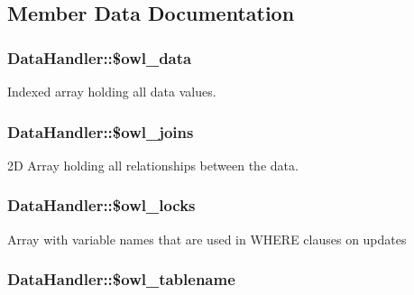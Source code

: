 \subsection{Member Data Documentation}
\hypertarget{classDataHandler_329b5524c379e0db6c4d5ce59f3c414f}{
\subsubsection{\setlength{\rightskip}{0pt plus 5cm}DataHandler::\$owl\_\-data}}
\label{classDataHandler_329b5524c379e0db6c4d5ce59f3c414f}


Indexed array holding all data values. \hypertarget{classDataHandler_da9b697f81ea82d269077f9c7445791d}{
\subsubsection{\setlength{\rightskip}{0pt plus 5cm}DataHandler::\$owl\_\-joins}}
\label{classDataHandler_da9b697f81ea82d269077f9c7445791d}


2D Array holding all relationships between the data. \hypertarget{classDataHandler_8c362014ccc2c85335cc56afe3966ee6}{
\subsubsection{\setlength{\rightskip}{0pt plus 5cm}DataHandler::\$owl\_\-locks}}
\label{classDataHandler_8c362014ccc2c85335cc56afe3966ee6}


Array with variable names that are used in WHERE clauses on updates \hypertarget{classDataHandler_24620784bde262bdd02227962d3b9605}{
\subsubsection{\setlength{\rightskip}{0pt plus 5cm}DataHandler::\$owl\_\-tablename}}
\label{classDataHandler_24620784bde262bdd02227962d3b9605}


